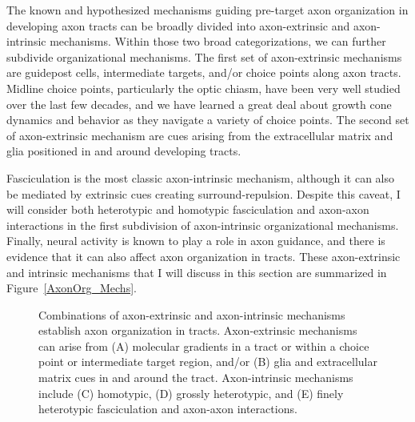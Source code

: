 \label{sec:MoleculesMechanisms}
The known and hypothesized mechanisms guiding pre-target axon organization in developing axon tracts can be broadly divided into axon-extrinsic and axon-intrinsic mechanisms. 
Within those two broad categorizations, we can further subdivide organizational mechanisms.
The first set of axon-extrinsic mechanisms are guidepost cells, intermediate targets, and/or choice points along axon tracts.
Midline choice points, particularly the optic chiasm, have been very well studied over the last few decades, and we have learned a great deal about growth cone dynamics and behavior as they navigate a variety of choice points.
The second set of axon-extrinsic mechanism are cues arising from the extracellular matrix and glia positioned in and around developing tracts.

Fasciculation is the most classic axon-intrinsic mechanism, although it can also be mediated by extrinsic cues creating surround-repulsion.
Despite this caveat, I will consider both heterotypic and homotypic fasciculation and axon-axon interactions in the first subdivision of axon-intrinsic organizational mechanisms.
Finally, neural activity is known to play a role in axon guidance, and there is evidence that it can also affect axon organization in tracts.
These axon-extrinsic and intrinsic mechanisms that I will discuss in this section are summarized in Figure~\ref{AxonOrg_Mechs}.
\begin{figure}[hbtp]
	\makebox[\textwidth]{\framebox[5cm]{\rule{0pt}{5cm}}}
	\caption[Common Mechanisms of Axon Organization in Tracts]{Combinations of axon-extrinsic and axon-intrinsic mechanisms establish axon organization in tracts. Axon-extrinsic mechanisms can arise from (A) molecular gradients in a tract or within a choice point or intermediate target region, and/or (B) glia and extracellular matrix cues in and around the tract. Axon-intrinsic mechanisms include (C) homotypic, (D) grossly heterotypic, and (E) finely heterotypic fasciculation and axon-axon interactions. \label{AxonOrg_ThreeModes}}
\end{figure}